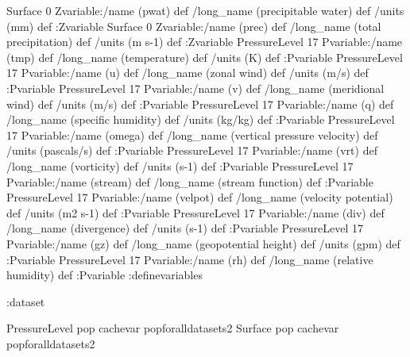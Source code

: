 \begin{ingrid}
Surface 0 Zvariable:/name (pwat) def /long_name (precipitable water) def /units (mm) def :Zvariable
Surface 0 Zvariable:/name (prec) def /long_name (total precipitation) def /units (m s-1) def :Zvariable
PressureLevel 17 Pvariable:/name (tmp) def /long_name (temperature) def /units (K) def :Pvariable
PressureLevel 17 Pvariable:/name (u) def /long_name (zonal wind) def /units (m/s) def :Pvariable
PressureLevel 17 Pvariable:/name (v) def /long_name (meridional wind) def /units (m/s) def :Pvariable
PressureLevel 17 Pvariable:/name (q) def /long_name (specific humidity)  def /units (kg/kg) def :Pvariable
PressureLevel 17 Pvariable:/name (omega) def /long_name (vertical pressure velocity)  def /units (pascals/s) def :Pvariable
PressureLevel 17 Pvariable:/name (vrt) def /long_name (vorticity)  def /units (s-1) def :Pvariable
PressureLevel 17 Pvariable:/name (stream) def /long_name (stream function) def :Pvariable
PressureLevel 17 Pvariable:/name (velpot) def /long_name (velocity potential) def /units (m2 s-1) def :Pvariable
PressureLevel 17 Pvariable:/name (div) def /long_name (divergence) def /units (s-1) def :Pvariable
PressureLevel 17 Pvariable:/name (gz) def /long_name (geopotential height) def /units (gpm) def :Pvariable
PressureLevel 17 Pvariable:/name (rh) def /long_name (relative humidity) def :Pvariable
:definevariables

:dataset

PressureLevel {pop} {cachevar pop}foralldatasets2
Surface {pop} {cachevar pop}foralldatasets2

\end{ingrid}





